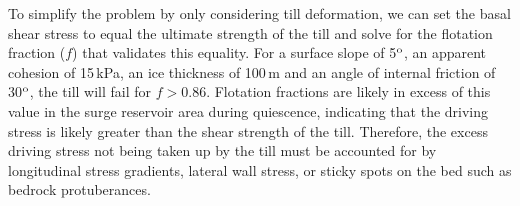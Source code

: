 \documentclass[draft,linenumbers]{agujournal}
\begin{document}
To simplify the problem by only considering till deformation, we can set the basal shear stress to equal the ultimate strength of the till \citep[e.g.][]{Truffer2001} and solve for the flotation fraction ($f$) that validates this equality. For a surface slope of 5$\rm ^o$, an apparent cohesion of 15\,kPa, an ice thickness of 100\,m and an angle of internal friction of 30$\rm ^o$, the till will fail for $f>0.86$. Flotation fractions are likely in excess of this value in the surge reservoir area during quiescence, indicating that the driving stress is likely greater than the shear strength of the till. Therefore, the excess driving stress not being taken up by the till must be accounted for by longitudinal stress gradients, lateral wall stress, or sticky spots on the bed such as bedrock protuberances. %

\end{document}
